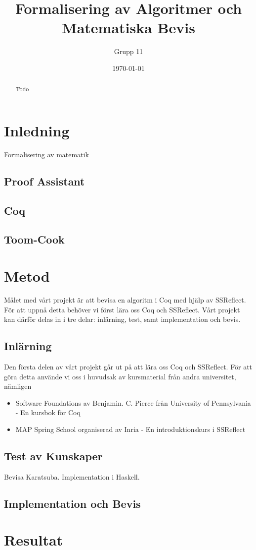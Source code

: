 \documentclass[a4paper]{article}
\begin{document}
\author{Grupp 11}
\title{Formalisering av Algoritmer och Matematiska Bevis}
\date{\today}


\begin{abstract}
Todo
\end{abstract}

\maketitle
\thispagestyle{empty}
\newpage
\tableofcontents
\newpage

\section{Inledning}
Formalisering av matematik

\subsection{Proof Assistant}
\subsection{Coq}
\subsection{Toom-Cook}

\section{Metod}

Målet med vårt projekt är att bevisa en algoritm i Coq med hjälp av SSReflect.
För att uppnå detta behöver vi först lära oss Coq och SSReflect. Vårt projekt
kan därför delas in i tre delar: inlärning, test, samt implementation och
bevis.

\subsection{Inlärning}
Den första delen av vårt projekt går ut på att lära oss Coq och SSReflect. För
att göra detta använde vi oss i huvudsak av kursmaterial från andra
universitet, nämligen

\begin{itemize}
  \item Software Foundations av Benjamin. C. Pierce från University of
    Pennsylvania - En kursbok för Coq
  \item MAP Spring School organiserad av Inria - En introduktionskurs i
    SSReflect
\end{itemize}

\subsection{Test av Kunskaper}
Bevisa Karatsuba. Implementation i Haskell.

\subsection{Implementation och Bevis}

\section{Resultat}
\end{document}
